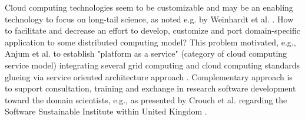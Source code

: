 Cloud computing technologies seem to be customizable and may be an enabling technology to focus on long-tail science, as noted e.g. by Weinhardt et al. \cite{Weinhardt2009}. How to facilitate and decrease an effort to develop, customize and port domain-specific application to some distributed computing model? This problem motivated, e.g., Anjum et al. to establish "platform as a service" (category of cloud computing service model) integrating several grid computing and cloud computing standards glueing via service oriented architecture approach \cite{Anjum2012}. Complementary approach is to support consultation, training and exchange in research software development toward the domain scientists, e.g., as presented by Crouch et al. regarding the Software Sustainable Institute within United Kingdom \cite{Crouch2013}.

